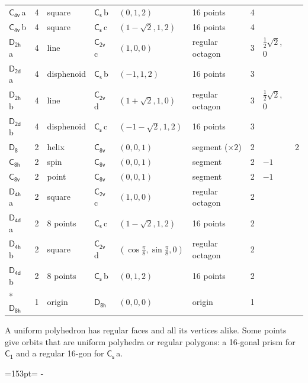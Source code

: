 \documentclass[10pt,a4paper]{article}
\newcommand{\needspace}[1]{\par\penalty-100\begingroup\dimen0=#1\relax\dimen2=\pagegoal
  \advance\dimen2-\pagetotal\ifdim\dimen0>\dimen2\relax\ifdim\dimen2>0pt\vfil\break\fi\fi
  \endgroup}
\numberwithin{equation}{section}
\newcommand{\grp}[1]{\mathsf{#1}}
\newcommand{\clsletter}[1]{\,{\scriptsize\color{black!55}#1}}
\newlength{\fillwidth}\newlength{\cellwidth}\newlength{\colwidth}
\begin{document}
{{\begin{longtable}{@{}lrllllr>{\RaggedRight\arraybackslash}p{\fillwidth}r@{}}
\href{C4v.pdf}{$\grp{C_{4v}}$}\clsletter{a} & 4 & square & \href{C1v.pdf}{$\grp{C_{s}}$}\clsletter{b} & $(0, 1, 2)$ & 16 points & 4 &  & \\
\href{C4v.pdf}{$\grp{C_{4v}}$}\clsletter{b} & 4 & square & \href{C1v.pdf}{$\grp{C_{s}}$}\clsletter{c} & $(1 - \sqrt{2}, 1, 2)$ & 16 points & 4 &  & \\
\href{D2h.pdf}{$\grp{D_{2h}}$}\clsletter{a} & 4 & line & \href{C2v.pdf}{$\grp{C_{2v}}$}\clsletter{c} & $(1, 0, 0)$ & regular octagon & 3 & ${\tfrac{1}{2}\sqrt{2}}$, ${0}$ & \\
\href{D2d.pdf}{$\grp{D_{2d}}$}\clsletter{a} & 4 & disphenoid & \href{C1v.pdf}{$\grp{C_{s}}$}\clsletter{b} & $(-1, 1, 2)$ & 16 points & 3 &  & \\
\href{D2h.pdf}{$\grp{D_{2h}}$}\clsletter{b} & 4 & line & \href{C2v.pdf}{$\grp{C_{2v}}$}\clsletter{d} & $(1 + \sqrt{2}, 1, 0)$ & regular octagon & 3 & ${\tfrac{1}{2}\sqrt{2}}$, ${0}$ & \\
\href{D2d.pdf}{$\grp{D_{2d}}$}\clsletter{b} & 4 & disphenoid & \href{C1v.pdf}{$\grp{C_{s}}$}\clsletter{c} & $(-1 - \sqrt{2}, 1, 2)$ & 16 points & 3 &  & \\
\href{D8.pdf}{$\grp{D_{8}}$} & 2 & helix & \href{C8v.pdf}{$\grp{C_{8v}}$} & $(0, 0, 1)$ & segment (${\times}2$) & 2 &  & 2\\
\href{C8h.pdf}{$\grp{C_{8h}}$} & 2 & spin & \href{C8v.pdf}{$\grp{C_{8v}}$} & $(0, 0, 1)$ & segment & 2 & ${-1}$ & \\
\href{C8v.pdf}{$\grp{C_{8v}}$} & 2 & point & \href{C8v.pdf}{$\grp{C_{8v}}$} & $(0, 0, 1)$ & segment & 2 & ${-1}$ & \\
\href{D4h.pdf}{$\grp{D_{4h}}$}\clsletter{a} & 2 & square & \href{C2v.pdf}{$\grp{C_{2v}}$}\clsletter{c} & $(1, 0, 0)$ & regular octagon & 2 &  & \\
\href{D4d.pdf}{$\grp{D_{4d}}$}\clsletter{a} & 2 & 8 points & \href{C1v.pdf}{$\grp{C_{s}}$}\clsletter{c} & $(1 - \sqrt{2}, 1, 2)$ & 16 points & 2 &  & \\
\href{D4h.pdf}{$\grp{D_{4h}}$}\clsletter{b} & 2 & square & \href{C2v.pdf}{$\grp{C_{2v}}$}\clsletter{d} & $(\cos\tfrac{\pi}{8}, \sin\tfrac{\pi}{8}, 0)$ & regular octagon & 2 &  & \\
\href{D4d.pdf}{$\grp{D_{4d}}$}\clsletter{b} & 2 & 8 points & \href{C1v.pdf}{$\grp{C_{s}}$}\clsletter{b} & $(0, 1, 2)$ & 16 points & 2 &  & \\*
\href{D8h.pdf}{$\grp{D_{8h}}$} & 1 & origin & \href{D8h.pdf}{$\grp{D_{8h}}$} & $(0, 0, 0)$ & origin & 1 &  & \\
\bottomrule\end{longtable}}}
A uniform polyhedron has regular faces and all its vertices alike. Some points give orbits that are uniform polyhedra or regular polygons: a 16-gonal prism for \href{C1.pdf}{$\grp{C_{1}}$} and a regular 16-gon for \href{C1v.pdf}{$\grp{C_{s}}$}\clsletter{a}.
\needspace{153pt}
\end{document}
